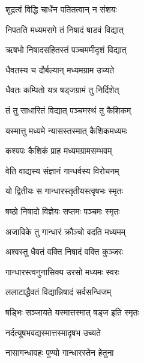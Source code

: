 {शूद्रत्वं विद्धि चार्धेन पतितत्वान् न संशयः}

{निपतति मध्यमरागे तं निषादं षाडवं विद्यात्}

{ऋषभो निषादसहितस्तं पञ्चममीदृशं विद्यात्}

{धैवतस्य च दौर्बल्यान् मध्यमग्राम उच्यते}

{धैवतः कम्पितो यत्र षड्जग्रामं तु निर्दिशेत्}

{तं तु साधारितं विद्यात् पञ्चमस्थं तु कैशिकम्}

{यस्मात्तु मध्यमे न्यासस्तस्मात् कैशिकमध्यमः}

{कश्यपः कैशिकं प्राह मध्यमग्रामसम्भवम्}

{वेति वाद्यस्य संज्ञानं गान्धर्वस्य विरोचनम्}

\closesub

\resetShloka

{यो द्वितीयः स गान्धारस्तृतीयस्त्वृषभः स्मृतः}

{षष्ठो निषादो विज्ञेयः सप्तमः पञ्चमः स्मृतः}

{अजाविके तु गान्धारं क्रौञ्चो वदति मध्यमम्}

{अश्वस्तु धैवतं वक्ति निषादं वक्ति कुञ्जरः}

{गान्धारस्त्वनुनासिक्य उरसो मध्यमः स्वरः}

{ललाटाद्धैवतं विद्यान्निषादं सर्वसन्धिजम्}

{षड्भिः सञ्जायते यस्मात्तस्मात् षड्ज इति स्मृतः}

{नर्दत्यूषभवद्यस्मात्तस्मादृषभ उच्यते}

{नासागन्धावहः पुण्यो गान्धारस्तेन हेतुना}

